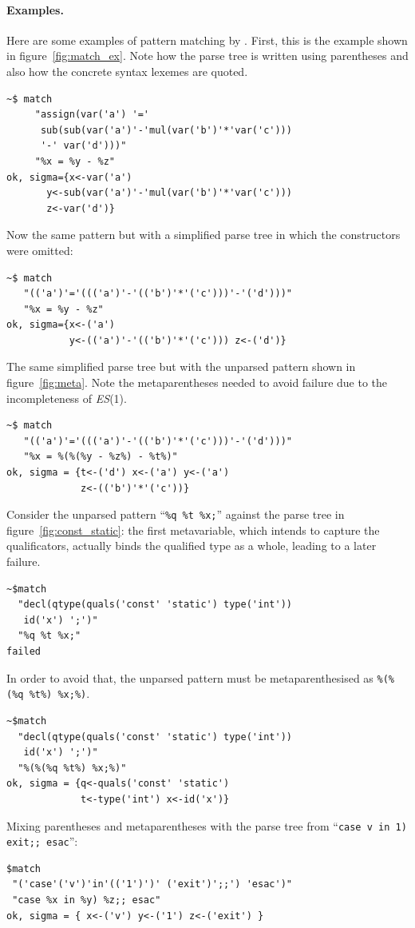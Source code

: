 \paragraph{Examples.}

Here are some examples of pattern matching by \Matchbox. First, this
is the example shown in figure~\ref{fig:match_ex}. Note how the parse
tree is written using parentheses and also how the concrete syntax
lexemes are quoted.
{\small
\begin{verbatim}
~$ match
     "assign(var('a') '='
      sub(sub(var('a')'-'mul(var('b')'*'var('c')))
      '-' var('d')))"
     "%x = %y - %z"
ok, sigma={x<-var('a')
       y<-sub(var('a')'-'mul(var('b')'*'var('c')))
       z<-var('d')}
\end{verbatim}
}
\noindent Now the same pattern but with a simplified parse tree in
which the constructors were omitted:
{\small
\begin{verbatim}
~$ match
   "(('a')'='((('a')'-'(('b')'*'('c')))'-'('d')))"
   "%x = %y - %z"
ok, sigma={x<-('a')
           y<-(('a')'-'(('b')'*'('c'))) z<-('d')}
\end{verbatim}
}
The same simplified parse tree but with the unparsed pattern shown
in figure~\ref{fig:meta}. Note the meta\-parentheses needed to avoid
failure due to the incompleteness of \textit{ES}(1).
{\small
\begin{verbatim}
~$ match
   "(('a')'='((('a')'-'(('b')'*'('c')))'-'('d')))"
   "%x = %(%(%y - %z%) - %t%)"
ok, sigma = {t<-('d') x<-('a') y<-('a')
             z<-(('b')'*'('c'))}
\end{verbatim}
}
Consider the unparsed pattern ``\texttt{\%q \%t \%x;}'' against the
parse tree in figure~\ref{fig:const_static}: the first meta\-variable,
which intends to capture the qualificators, actually binds the
qualified type as a whole, leading to a later failure.
{\small
\begin{verbatim}
~$match
  "decl(qtype(quals('const' 'static') type('int'))
   id('x') ';')"
  "%q %t %x;"
failed
\end{verbatim}
}
In order to avoid that, the unparsed pattern must be
meta\-parenthesised as \texttt{\%(\%(\%q \%t\%) \%x;\%)}.
{\small
\begin{verbatim}
~$match
  "decl(qtype(quals('const' 'static') type('int'))
   id('x') ';')"
  "%(%(%q %t%) %x;%)"
ok, sigma = {q<-quals('const' 'static')
             t<-type('int') x<-id('x')}
\end{verbatim}
}
Mixing parentheses and meta\-parentheses with the parse
tree from ``\texttt{case v in 1) exit;; esac}'':
{\small
\begin{verbatim}
$match
 "('case'('v')'in'(('1')')' ('exit')';;') 'esac')"
 "case %x in %y) %z;; esac"
ok, sigma = { x<-('v') y<-('1') z<-('exit') }
\end{verbatim}
}

